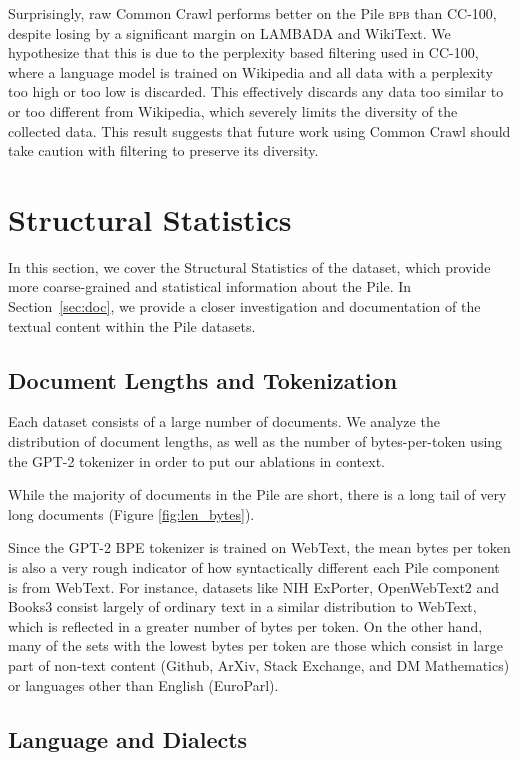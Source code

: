 Surprisingly, raw Common Crawl performs better on the Pile \textsc{bpb} than CC-100, despite losing by a significant margin on LAMBADA and WikiText. We hypothesize that this is due to the perplexity based filtering used in CC-100, where a language model is trained on Wikipedia and all data with a perplexity too high or too low is discarded. This effectively discards any data too similar to or too different from Wikipedia, which severely limits the diversity of the collected data. This result suggests that future work using Common Crawl should take caution with filtering to preserve its diversity.

\section{Structural Statistics}

In this section, we cover the Structural Statistics of the dataset, which provide more coarse-grained and statistical information about the Pile. In Section~\ref{sec:doc}, we provide a closer investigation and documentation of the textual content within the Pile datasets.

\subsection{Document Lengths and Tokenization}

Each dataset consists of a large number of documents. We analyze the distribution of document lengths, as well as the number of bytes-per-token using the GPT-2 tokenizer in order to put our ablations in context. 

While the majority of documents in the Pile are short, there is a long tail of very long documents (Figure \ref{fig:len_bytes}). 

Since the GPT-2 BPE tokenizer is trained on WebText, the mean bytes per token is also a very rough indicator of how syntactically different each Pile component is from WebText. For instance, datasets like NIH ExPorter, OpenWebText2 and Books3 consist largely of ordinary text in a similar distribution to WebText, which is reflected in a greater number of bytes per token. On the other hand, many of the sets with the lowest bytes per token are those which consist in large part of non-text content (Github, ArXiv, Stack Exchange, and DM Mathematics) or languages other than English (EuroParl).

\subsection{Language and Dialects}

